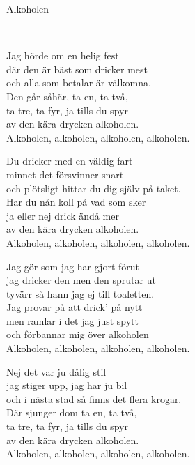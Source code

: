 \begin{song}{Alkoholen}

	
	\\

    \showversenumber	
	Jag hörde om en helig fest\\
	där den är bäst som dricker mest\\
	och alla som betalar är välkomna.\\
	Den går såhär, ta en, ta två,\\
	ta tre, ta fyr, ja tills du spyr\\
	av den kära drycken alkoholen.\\
	Alkoholen, alkoholen, alkoholen, alkoholen.
	
    \showversenumber
	Du dricker med en väldig fart\\
	minnet det försvinner snart\\
	och plötsligt hittar du dig själv på taket.\\
	Har du nån koll på vad som sker\\
	ja eller nej drick ändå mer\\
	av den kära drycken alkoholen.\\
	Alkoholen, alkoholen, alkoholen, alkoholen.
	
    \showversenumber
	Jag gör som jag har gjort förut\\
	jag dricker den men den sprutar ut\\
	tyvärr så hann jag ej till toaletten.\\
	Jag provar på att drick' på nytt\\
	men ramlar i det jag just spytt\\
	och förbannar mig över alkoholen\\
	Alkoholen, alkoholen, alkoholen, alkoholen.
	
    \showversenumber
	Nej det var ju dålig stil\\
	jag stiger upp, jag har ju bil\\
	och i nästa stad så finns det flera krogar.\\
	Där sjunger dom  ta en, ta två,\\
	ta tre, ta fyr, ja tills du spyr\\
	av den kära drycken alkoholen.\\
	Alkoholen, alkoholen, alkoholen, alkoholen.
	
\end{song}
